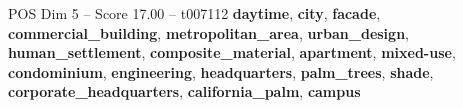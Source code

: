 \begin{textsample}{POS Dim 5 – Score 17.00 – t007112}  \label{ex:f5_pos_020}
\textbf{daytime}, \textbf{city}, \textbf{facade}, \textbf{commercial\_building}, \textbf{metropolitan\_area}, \textbf{urban\_design}, \textbf{human\_settlement}, \textbf{composite\_material}, \textbf{apartment}, \textbf{mixed-use}, \textbf{condominium}, \textbf{engineering}, \textbf{headquarters}, \textbf{palm\_trees}, \textbf{shade}, \textbf{corporate\_headquarters}, \textbf{california\_palm}, \textbf{campus}

\end{textsample}
